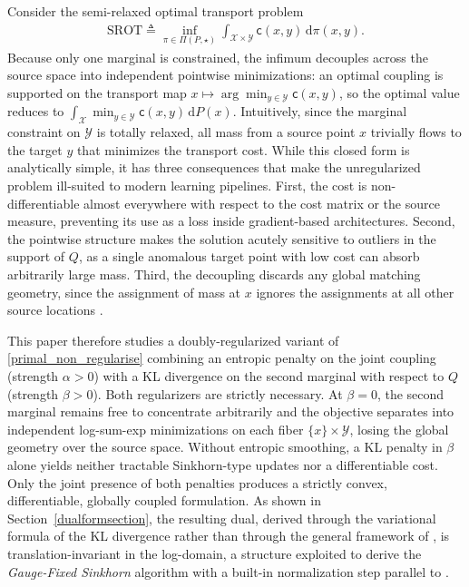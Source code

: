 \documentclass{article}
\begin{document}
Consider the semi-relaxed optimal transport problem
\begin{align}
  \label{primal_non_regularise}
  \mathrm{SROT} \triangleq \inf_{\pi \in \Pi(P,\star)}
  \int_{\mathcal{X} \times \mathcal{Y}} \mathsf{c}(x,y) \, \mathrm{d}\pi(x,y).
\end{align}
Because only one marginal is constrained, the infimum decouples across the source space
into independent pointwise minimizations: an optimal coupling is supported on the
transport map $x \mapsto \arg\min_{y \in \mathcal{Y}} \mathsf{c}(x,y)$, so the optimal
value reduces to $\int_{\mathcal{X}} \min_{y \in \mathcal{Y}} \mathsf{c}(x,y) \,
\mathrm{d}P(x)$. Intuitively, since the marginal constraint on $\mathcal{Y}$ is totally relaxed, all mass from a source point $x$ trivially flows to the target $y$ that minimizes the transport cost. While this closed form is analytically simple, it has three
consequences that make the unregularized problem ill-suited to modern learning pipelines.
First, the cost is non-differentiable almost everywhere with respect to the cost matrix
or the source measure, preventing its use as a loss inside gradient-based architectures.
Second, the pointwise structure makes the solution acutely sensitive to outliers in the
support of $Q$, as a single anomalous target point with low cost can absorb arbitrarily
large mass. Third, the decoupling discards any global matching geometry, since the
assignment of mass at $x$ ignores the assignments at all other source locations
\cite{le2021robust, nguyen2023unbalanced}.

This paper therefore studies a doubly-regularized variant of \eqref{primal_non_regularise}
combining an entropic penalty on the joint coupling (strength $\alpha > 0$) with a KL
divergence on the second marginal with respect to $Q$ (strength $\beta > 0$). Both
regularizers are strictly necessary. At $\beta = 0$, the second marginal remains free to
concentrate arbitrarily and the objective separates into independent log-sum-exp
minimizations on each fiber $\{x\} \times \mathcal{Y}$, losing the global geometry over
the source space. Without entropic smoothing, a KL penalty in $\beta$ alone yields
neither tractable Sinkhorn-type updates nor a differentiable cost. Only the joint
presence of both penalties produces a strictly convex, differentiable, globally coupled
formulation. As shown in Section~\ref{dualformsection}, the resulting dual, derived through the
variational formula of the KL divergence rather than through the general framework of
\cite{chizat2018scaling}, is translation-invariant in the log-domain, a structure
exploited to derive the \emph{Gauge-Fixed Sinkhorn} algorithm with a built-in
normalization step parallel to \cite{sejourne2022faster}.
\end{document}
